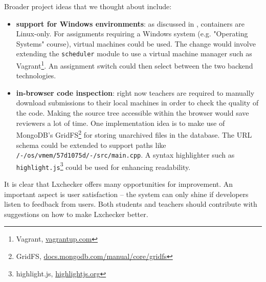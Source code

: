 Broader project ideas that we thought about include:
\begin{itemize}
	\item \textbf{support for Windows environments}: as discussed in , containers are Linux-only. For assignments requiring a Windows system (e.g. "Operating Systems" course), virtual machines could be used. The change would involve extending the \texttt{scheduler} module to use a virtual machine manager such as Vagrant\footnote{Vagrant, \url{vagrantup.com}}. An assignment switch could then select between the two backend technologies. 
	\item \textbf{in-browser code inspection}: right now teachers are required to manually download submissions to their local machines in order to check the quality of the code. Making the source tree accessible within the browser would save reviewers a lot of time. One implementation idea is to make use of MongoDB's GridFS\footnote{GridFS, \url{docs.mongodb.com/manual/core/gridfs}} for storing unarchived files in the database. The URL schema could be extended to support paths like \texttt{/-/os/vmem/57d1075d/-/src/main.cpp}. A syntax highlighter such as \texttt{highlight.js}\footnote{highlight.js, \url{highlightjs.org}} could be used for enhancing readability.
\end{itemize}

It is clear that Lxchecker offers many opportunities for improvement. An important aspect is user satisfaction -- the system can only shine if developers listen to feedback from users. Both students and teachers should contribute with suggestions on how to make Lxchecker better.
